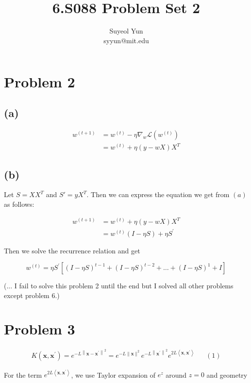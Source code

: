 \documentclass[13pt]{article}
\begin{document}
 
\title{6.S088 Problem Set 2}
\author{Suyeol Yun\\
syyun@mit.edu}
\maketitle

\section{Problem 2}
\subsection{(a)}
\begin{align*}
w^{(t+1)}&=w^{(t)}-\eta \nabla_w \mathcal{L}\left(w^{(t)}\right)\\
&=w^{(t)}+\eta(y-w X) X^T
\end{align*}

\subsection{(b)}
Let $S=XX^T$ and $S'=yX^T$. Then we can express the equation we get from $(a)$ as follows:

\begin{align*}
    w^{(t+1)}&=w^{(t)}+\eta(y-w X) X^T \\
    &=w^{(t)}(I-\eta S)+\eta S^{\prime}
\end{align*}

Then we solve the recurrence relation and get

$$w^{(t)}=\eta S^{\prime}\left[(I-\eta S)^{t-1}+(I-\eta S)^{t-2}+\ldots+(I-\eta S)^1+I\right]$$

(... I fail to solve this problem 2 until the end but I solved all other problems except problem 6.)


\section{Problem 3}
\begin{align*}
    K\left(\mathbf{x}, \mathbf{x}^{\prime}\right)=e^{-L\left\|\mathbf{x} - \mathbf{x}^{\prime}\right\|^2}=e^{-L\|\mathbf{x}\|^2} e^{-L\left\|\mathbf{x}^{\prime}\right\|^2} e^{2L\left\langle\mathbf{x}, \mathbf{x}^{\prime}\right\rangle} && (1)
\end{align*}

For the term $e^{2L\left\langle\mathbf{x}, \mathbf{x}^{\prime}\right\rangle}$, we use Taylor expansion of $e^z$ around $z=0$ and geometry
\end{document}
